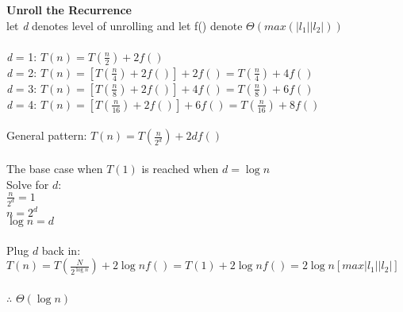 \documentclass[12pt, a4paper]{article}
\begin{document}
    \textbf{Unroll the Recurrence}\\
    let \textit{d} denotes level of unrolling and let f() denote \(\Theta{(max(|l_1||l_2|))}\)\\
    \\
    \textit{d} = 1: \(T(n) = T(\frac{n}{2}) + 2f()\)\\
    \textit{d} = 2: \(T(n) = [T(\frac{n}{4}) + 2f()] + 2f() = T(\frac{n}{4}) + 4f()\)\\
    \textit{d} = 3: \(T(n) = [T(\frac{n}{8}) + 2f()] + 4f() = T(\frac{n}{8}) + 6f()\)\\
    \textit{d} = 4: \(T(n) = [T(\frac{n}{16}) + 2f()] + 6f() = T(\frac{n}{16}) + 8f()\)\\
    \\
    General pattern: \(T(n) = T(\frac{n}{2^{d}}) + 2df()\)\\
    \\
    The base case when \(T(1)\) is reached when \(d = \log{n}\)\\
    Solve for \(d\):\\
    \(\frac{n}{2^d} = 1\)\\
    \(n = 2^d\)\\
    \(\log{n} = d\)\\
    \\
    Plug \(d\) back in:\\
    \(T(n) = T(\frac{N}{2^{\log{n}}}) + 2\log{n}f() = T(1) + 2\log{n}f() = 2\log{n}[max|l_1||l_2|]\)\\
    \\
    $\therefore$ $\Theta{(\log{n})}$
    \newpage
    
\end{document}
